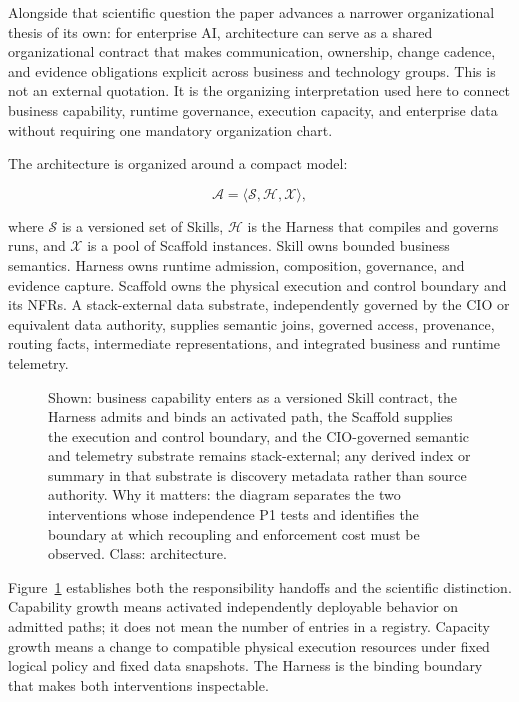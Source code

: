 Alongside that scientific question the paper advances a narrower organizational thesis of its own: for enterprise AI, architecture can serve as a shared organizational contract that makes communication, ownership, change cadence, and evidence obligations explicit across business and technology groups. This is not an external quotation. It is the organizing interpretation used here to connect business capability, runtime governance, execution capacity, and enterprise data without requiring one mandatory organization chart.

The architecture is organized around a compact model:

\begin{equation}
\mathcal{A}=\langle\mathcal{S},\mathcal{H},\mathcal{X}\rangle,
\end{equation}

where $\mathcal{S}$ is a versioned set of Skills, $\mathcal{H}$ is the Harness that compiles and governs runs, and $\mathcal{X}$ is a pool of Scaffold instances. Skill owns bounded business semantics. Harness owns runtime admission, composition, governance, and evidence capture. Scaffold owns the physical execution and control boundary and its NFRs. A stack-external data substrate, independently governed by the CIO or equivalent data authority, supplies semantic joins, governed access, provenance, routing facts, intermediate representations, and integrated business and runtime telemetry.

\begin{figure}[t]
\centering
\caption{Shown: business capability enters as a versioned Skill contract, the Harness admits and binds an activated path, the Scaffold supplies the execution and control boundary, and the CIO-governed semantic and telemetry substrate remains stack-external; any derived index or summary in that substrate is discovery metadata rather than source authority. Why it matters: the diagram separates the two interventions whose independence P1 tests and identifies the boundary at which recoupling and enforcement cost must be observed. Class: architecture.}
\label{fig:dual-scaling}
\end{figure}

Figure~\ref{fig:dual-scaling} establishes both the responsibility handoffs and the scientific distinction. Capability growth means activated independently deployable behavior on admitted paths; it does not mean the number of entries in a registry. Capacity growth means a change to compatible physical execution resources under fixed logical policy and fixed data snapshots. The Harness is the binding boundary that makes both interventions inspectable.

